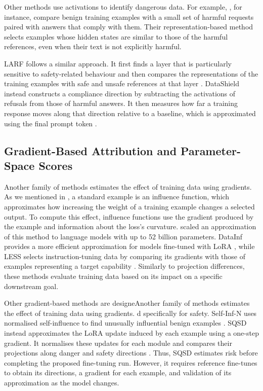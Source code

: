 Other methods use activations to identify dangerous data. For example,
\citet{he2024safe_data}, for instance, compare benign training examples with a small set of harmful requests paired with answers that comply with them. Their representation-based method selects examples whose hidden states are similar to those of the harmful references, even when their text is not explicitly harmful.

LARF follows a similar approach. It first finds a layer that is particularly sensitive to safety-related behaviour and then compares the representations of the training examples with safe and unsafe references at that layer \citep{li2025larf}. DataShield instead constructs a compliance direction by subtracting the activations of refusals from those of harmful answers. It then measures how far a training response moves along that direction relative to a baseline, which is approximated using the final prompt token \citep{zhang2026datashield}.

\subsection{Gradient-Based Attribution and Parameter-Space Scores}
\label{subsec:rw_weight_encoders}

Another family of methods estimates the effect of training data using gradients. As we mentioned in , a standard example is an influence function, which approximates how increasing the weight of a training example changes a selected output. To compute this effect, influence functions use the gradient produced by the example and information about the loss's curvature. \citet{grosse2023influence} scaled an approximation of this method to language models with up to 52 billion parameters. DataInf provides a more efficient approximation for models fine-tuned with LoRA \citep{kwon2023datainf}, while LESS selects instruction-tuning data by comparing its gradients with those of examples representing a target capability \citep{xia2024less}. Similarly to projection differences, these methods evaluate training data based on its impact on a specific downstream goal.

Other gradient-based methods are designeAnother family of methods estimates the effect of training data using gradients. d specifically for safety. Self-Inf-N uses normalised self-influence to find unusually influential benign examples \citep{guan2025benign}. SQSD instead approximates the LoRA update induced by each example using a one-step gradient. It normalises these updates for each module and compares their projections along danger and safety directions \citep{wang2026parameterdynamicsriskscoring}. Thus, SQSD estimates risk before completing the proposed fine-tuning run. However, it requires reference fine-tunes to obtain its directions, a gradient for each example, and validation of its approximation as the model changes.

